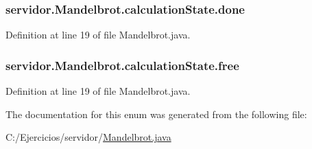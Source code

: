 \subsubsection[{\texorpdfstring{done}{done}}]{\setlength{\rightskip}{0pt plus 5cm}servidor.\+Mandelbrot.\+calculation\+State.\+done}\hypertarget{enumservidor_1_1Mandelbrot_1_1calculationState_af6bab61e31147be188ed02d6aa5b90df}{}\label{enumservidor_1_1Mandelbrot_1_1calculationState_af6bab61e31147be188ed02d6aa5b90df}


Definition at line 19 of file Mandelbrot.\+java.

\subsubsection[{\texorpdfstring{free}{free}}]{\setlength{\rightskip}{0pt plus 5cm}servidor.\+Mandelbrot.\+calculation\+State.\+free}\hypertarget{enumservidor_1_1Mandelbrot_1_1calculationState_a389a193a7ce972884fbb89e576175861}{}\label{enumservidor_1_1Mandelbrot_1_1calculationState_a389a193a7ce972884fbb89e576175861}


Definition at line 19 of file Mandelbrot.\+java.



The documentation for this enum was generated from the following file\+:\begin{DoxyCompactItemize}
\item 
C\+:/\+Ejercicios/servidor/\hyperlink{Mandelbrot_8java}{Mandelbrot.\+java}\end{DoxyCompactItemize}
